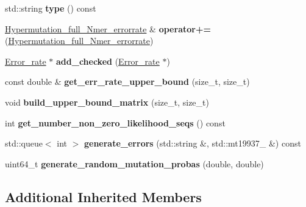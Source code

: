 \begin{DoxyCompactItemize}
std\+::string {\bfseries type} () const
\item 
\mbox{\label{classHypermutation__full__Nmer__errorrate_a1a7706da6d16fafe2e8846774f8ccf01}} 
\hyperlink{classHypermutation__full__Nmer__errorrate}{Hypermutation\+\_\+full\+\_\+\+Nmer\+\_\+errorrate} \& {\bfseries operator+=} (\hyperlink{classHypermutation__full__Nmer__errorrate}{Hypermutation\+\_\+full\+\_\+\+Nmer\+\_\+errorrate})
\item 
\mbox{\label{classHypermutation__full__Nmer__errorrate_ae5e6673a5f849a842fd85c2aac873a06}} 
\hyperlink{classError__rate}{Error\+\_\+rate} $\ast$ {\bfseries add\+\_\+checked} (\hyperlink{classError__rate}{Error\+\_\+rate} $\ast$)
\item 
\mbox{\label{classHypermutation__full__Nmer__errorrate_a033630f63b43fc18b5db550fac246e6b}} 
const double \& {\bfseries get\+\_\+err\+\_\+rate\+\_\+upper\+\_\+bound} (size\+\_\+t, size\+\_\+t)
\item 
\mbox{\label{classHypermutation__full__Nmer__errorrate_a09ef2ea013441efdb25067f5e6e87c5c}} 
void {\bfseries build\+\_\+upper\+\_\+bound\+\_\+matrix} (size\+\_\+t, size\+\_\+t)
\item 
\mbox{\label{classHypermutation__full__Nmer__errorrate_a84ebde8adf499035b5c6036032787da1}} 
int {\bfseries get\+\_\+number\+\_\+non\+\_\+zero\+\_\+likelihood\+\_\+seqs} () const
\item 
\mbox{\label{classHypermutation__full__Nmer__errorrate_abfa7df0d953e746cdcade2d7689844d4}} 
std\+::queue$<$ int $>$ {\bfseries generate\+\_\+errors} (std\+::string \&, std\+::mt19937\+\_ \&) const
\item 
\mbox{\label{classHypermutation__full__Nmer__errorrate_a963811f5ccad25311471048896ebe7e8}} 
uint64\+\_\+t {\bfseries generate\+\_\+random\+\_\+mutation\+\_\+probas} (double, double)
\end{DoxyCompactItemize}
\subsection*{Additional Inherited Members}


